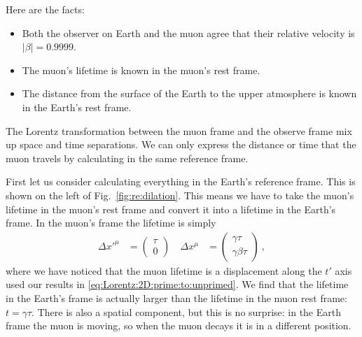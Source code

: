 \documentclass[12pt, oneside]{report}    %
\begin{document}
Here are the facts:
\begin{itemize}
    \item Both the observer on Earth and the muon agree that their relative velocity is $|\beta| = 0.9999$. 
    \item The muon's lifetime is known in the muon's rest frame. 
    \item The distance from the surface of the Earth to the upper atmosphere is known in the Earth's rest frame. 
\end{itemize}
The Lorentz transformation between the muon frame and the observe frame mix up space and time separations. We can only express the distance or time that the muon travels by calculating in the same reference frame. 


First let us consider calculating everything in the Earth's reference frame. This is shown on the left of Fig.~\ref{fig:re:dilation}. This means we have to take the muon's lifetime in the muon's rest frame and convert it into a lifetime in the Earth's frame. In the muon's frame the lifetime is simply 
\begin{align}
    \Delta x'^\mu &= 
    \begin{pmatrix}
    \tau \\ 0     
    \end{pmatrix} \ 
    &
    \Delta x^\mu &=
    \begin{pmatrix}
    \gamma \tau \\ \gamma\beta \tau    
    \end{pmatrix} \ ,
\end{align}
where we have noticed that the muon lifetime is a displacement along the $t'$ axis used our results in \eqref{eq:Lorentz:2D:prime:to:unprimed}. We find that the lifetime in the Earth's frame is actually larger than the lifetime in the muon rest frame: $t = \gamma \tau$. There is also a spatial component, but this is no surprise: in the Earth frame the muon is moving, so when the muon decays it is in a different position. 
\end{document}
